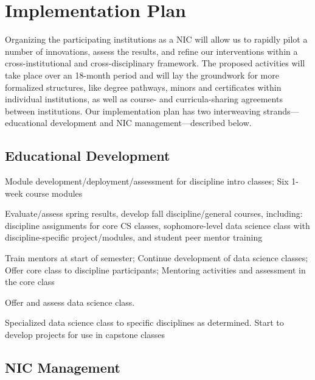 \section{Implementation Plan}
Organizing the participating institutions as a NIC will allow us to rapidly pilot a number of innovations, assess the results, and refine our interventions within a cross-institutional and cross-disciplinary framework. The proposed activities will take place over an 18-month period and will lay the groundwork for more formalized structures, like degree pathways, minors and certificates within individual institutions, as well as course- and curricula-sharing agreements between institutions. Our implementation plan has two interweaving strands---educational development and NIC management---described below.

\subsection{Educational Development}
\begin{description}
\setlength\itemsep{0in}
    \item[Spring 2020:] Module development/deployment/assessment for discipline intro classes; Six 1-week course modules
    \item[Summer 2020:] Evaluate/assess spring results, develop fall discipline/general courses, including: discipline assignments for core CS classes, sophomore-level data science class with discipline-specific project/modules, and student peer mentor training
    \item[Fall 2020:] Train mentors at start of semester; Continue development of data science classes; Offer core class to discipline participants; Mentoring activities and assessment in the core class
    \item[Spring 2021:] Offer and assess data science class.
    \item[Summer 2021:] Specialized data science class to specific disciplines as determined. Start to develop projects for use in capstone classes
\end{description}

\subsection{NIC Management}


